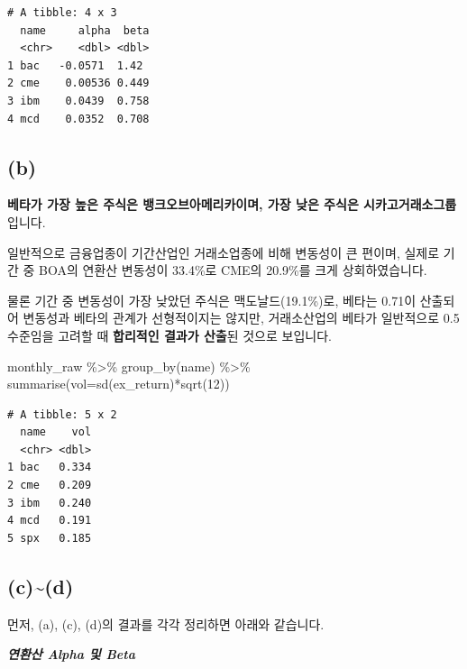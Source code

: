 \documentclass[
  a4paper,
  DIV=11,
  numbers=noendperiod]{scrreprt}
\newenvironment{Shaded}{\begin{snugshade}}{\end{snugshade}}
\newcommand{\AttributeTok}[1]{\textcolor[rgb]{0.40,0.45,0.13}{#1}}
\newcommand{\DecValTok}[1]{\textcolor[rgb]{0.68,0.00,0.00}{#1}}
\newcommand{\FunctionTok}[1]{\textcolor[rgb]{0.28,0.35,0.67}{#1}}
\newcommand{\NormalTok}[1]{\textcolor[rgb]{0.00,0.23,0.31}{#1}}
\newcommand{\SpecialCharTok}[1]{\textcolor[rgb]{0.37,0.37,0.37}{#1}}
\begin{document}
\begin{verbatim}
# A tibble: 4 x 3
  name     alpha  beta
  <chr>    <dbl> <dbl>
1 bac   -0.0571  1.42 
2 cme    0.00536 0.449
3 ibm    0.0439  0.758
4 mcd    0.0352  0.708
\end{verbatim}

\subsection*{(b)}\label{b}

\textbf{베타가 가장 높은 주식은 뱅크오브아메리카이며, 가장 낮은 주식은
시카고거래소그룹}입니다.

일반적으로 금융업종이 기간산업인 거래소업종에 비해 변동성이 큰 편이며,
실제로 기간 중 BOA의 연환산 변동성이 33.4\%로 CME의 20.9\%를 크게
상회하였습니다.

물론 기간 중 변동성이 가장 낮았던 주식은 맥도날드(19.1\%)로, 베타는
0.71이 산출되어 변동성과 베타의 관계가 선형적이지는 않지만, 거래소산업의
베타가 일반적으로 0.5수준임을 고려할 때 \textbf{합리적인 결과가 산출}된
것으로 보입니다.

\begin{Shaded}
\begin{Highlighting}[]
\NormalTok{monthly\_raw }\SpecialCharTok{\%\textgreater{}\%} 
  \FunctionTok{group\_by}\NormalTok{(name) }\SpecialCharTok{\%\textgreater{}\%} 
  \FunctionTok{summarise}\NormalTok{(}\AttributeTok{vol=}\FunctionTok{sd}\NormalTok{(ex\_return)}\SpecialCharTok{*}\FunctionTok{sqrt}\NormalTok{(}\DecValTok{12}\NormalTok{))}
\end{Highlighting}
\end{Shaded}

\begin{verbatim}
# A tibble: 5 x 2
  name    vol
  <chr> <dbl>
1 bac   0.334
2 cme   0.209
3 ibm   0.240
4 mcd   0.191
5 spx   0.185
\end{verbatim}

\subsection*{(c)\textasciitilde(d)}\label{cd}

먼저, (a), (c), (d)의 결과를 각각 정리하면 아래와 같습니다.

\textbf{\emph{연환산 Alpha 및 Beta}}
\end{document}
